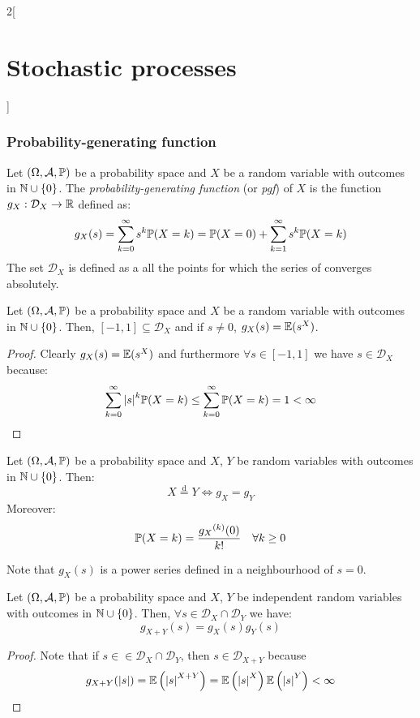 \documentclass[../../../main_math.tex]{subfiles}
\begin{document}
\begin{multicols}{2}[\section{Stochastic processes}]
  \subsubsection{Probability-generating function}
  \begin{definition}
    Let $(\Omega,\mathcal{A},\mathbb{P})$ be a probability space and $X$ be a random variable with outcomes in $\mathbb{N}\cup\{0\}$. The \emph{probability-generating function} (or \emph{pgf}) of $X$ is the function $g_X:\mathcal{D}_X\rightarrow \mathbb{R}$ defined as:
    \begin{equation}\label{SP:probgenfunc}
      g_X(s)=\sum_{k=0}^\infty s^k\mathbb{P}(X=k)=\mathbb{P}(X=0)+\sum_{k=1}^\infty s^k\mathbb{P}(X=k)
    \end{equation}
    The set $\mathcal{D}_X$ is defined as a all the points for which the series of  converges absolutely.
  \end{definition}
  \begin{lemma}
    Let $(\Omega,\mathcal{A},\mathbb{P})$ be a probability space and $X$ be a random variable with outcomes in $\mathbb{N}\cup\{0\}$. Then, $[-1,1]\subseteq \mathcal{D}_X$ and if $s\ne 0$, $g_X(s)=\mathbb{E}(s^X)$.
  \end{lemma}
  \begin{proof}
    Clearly $g_X(s)=\mathbb{E}(s^X)$ and furthermore $\forall s\in[-1,1]$ we have $s\in \mathcal{D}_X$ because:
    $$\sum_{k=0}^\infty \abs{s}^k\mathbb{P}(X=k)\leq \sum_{k=0}^\infty \mathbb{P}(X=k)=1<\infty$$
  \end{proof}
  \begin{theorem}
    Let $(\Omega,\mathcal{A},\mathbb{P})$ be a probability space and $X$, $Y$ be random variables with outcomes in $\mathbb{N}\cup\{0\}$. Then: $$X\overset{\text{d}}{=}Y\iff g_X=g_Y$$
    Moreover: $$\mathbb{P}(X=k)=\frac{{g_X}^{(k)}(0)}{k!}\quad \forall k\geq 0$$
  \end{theorem}
  \begin{sproof}
    Note that $g_X(s)$ is a power series defined in a neighbourhood of $s=0$.
  \end{sproof}
  \begin{theorem}
    Let $(\Omega,\mathcal{A},\mathbb{P})$ be a probability space and $X$, $Y$ be independent random variables with outcomes in $\mathbb{N}\cup\{0\}$. Then, $\forall s\in\mathcal{D}_X\cap \mathcal{D}_Y$ we have: $$g_{X+Y}(s)=g_X(s)g_Y(s)$$
  \end{theorem}
  \begin{proof}
    Note that if $s\in \in\mathcal{D}_X\cap \mathcal{D}_Y$, then $s\in\mathcal{D}_{X+Y}$ because
    $$g_{X+Y}(\abs{s})=\mathbb{E}\left(\abs{s}^{X+Y}\right)=\mathbb{E}\left(\abs{s}^X\right)\mathbb{E}\left(\abs{s}^Y\right)<\infty$$

\end{proof}
\end{multicols}
\end{document}
